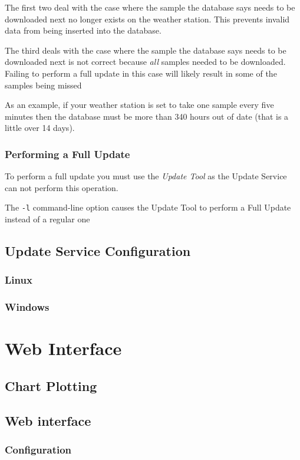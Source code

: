 \documentclass[a4paper,10pt,draft]{book}
\newcommand{\partnumber}{\ifthenelse{\isundefined{\projectnum}}{}{\projectnum-\docnum	\ifthenelse{\equal{\docrev}{001}}{}{.\docrev}}}
\begin{document}
The first two deal with the case where the sample the database says needs to be downloaded next no longer exists on the weather station. This prevents invalid data from being inserted into the database.

The third deals with the case where the sample the database says needs to be downloaded next is not correct because \emph{all} samples needed to be downloaded. Failing to perform a full update in this case will likely result in some of the samples being missed

As an example, if your weather station is set to take one sample every five minutes then the database must be more than 340 hours out of date (that is a little over 14 days).


\subsection{Performing a Full Update}
To perform a full update you must use the \emph{Update Tool} as the Update Service can not perform this operation.

The \verb|-l| command-line option causes the Update Tool to perform a Full Update instead of a regular one



\section{Update Service Configuration}
\subsection{Linux}
\subsection{Windows}


\chapter{Web Interface}
\section{Chart Plotting}

\section{Web interface}
\subsection{Configuration}


\newpage
\thispagestyle{empty}
\begin{flushright}
\null
\vfill
\tt \partnumber
\end{flushright}
\end{document}
